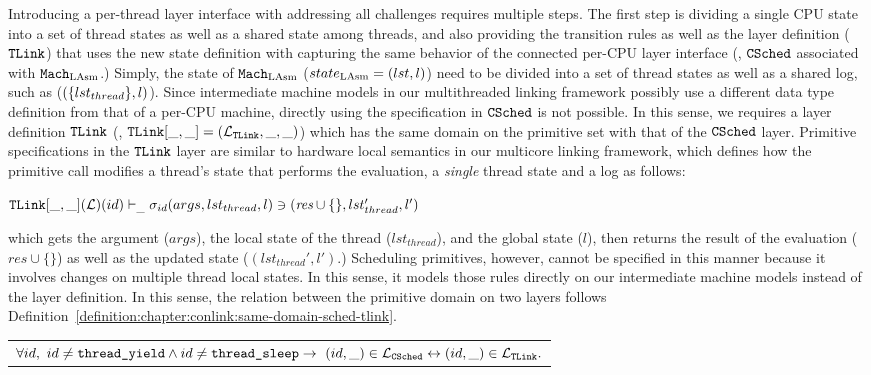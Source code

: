 Introducing a per-thread layer interface with addressing all challenges requires multiple steps. 
The first step is
dividing a single CPU state into a set of thread states as well as a shared state among threads,
and also providing 
the transition rules as well as the layer definition (${{\mathrm{\texttt{TLink}}}}$) that uses the new state definition with capturing 
the same behavior of the connected per-CPU layer interface (\ie, ${{\mathrm{\texttt{CSched}}}}$ associated with ${\mathrm{\texttt{Mach}}}_{\mathrm{LAsm}}$.)
Simply, the state of ${\mathrm{\texttt{Mach}}}_{\mathrm{LAsm}}$ ($state_{\mathrm{LAsm}} = (lst, l)$) need to be divided into 
a set of thread states as well as a shared log, such as ($(\{lst_{thread}\}, l)$).
Since intermediate machine models in our multithreaded linking framework possibly use a different data type definition from that of a per-CPU machine, 
directly using the specification in  ${{\mathrm{\texttt{CSched}}}}$ is not possible. 
In this sense, 
we requires a layer definition ${{\mathrm{\texttt{TLink}}}}$ (\ie, ${{\mathrm{\texttt{TLink}}}}[\_, \_] = (\mathcal{L}_{{{\mathrm{\texttt{TLink}}}}}, \_, \_)$) which has the same domain on the primitive set with that of the ${{\mathrm{\texttt{CSched}}}}$ layer.
Primitive specifications in the ${{\mathrm{\texttt{TLink}}}}$ layer are similar to hardware local semantics in our multicore linking framework,
which defines how the primitive call modifies a thread's state that performs the evaluation,
a \textit{single} thread state and a log as follows:
\begin{center}
${{\mathrm{\texttt{TLink}}}}[\_, \_](\mathcal{L})(id)
 \vdash_{\_}  \sigma_{id}(args, lst_{thread}, l) \ni (\textit{res}\cup \{\}, lst_{thread}', l')$
\end{center}
which gets the argument ($args$), the local state of the thread ($lst_{thread}$), and the global state ($l$), then 
returns the result of the evaluation ($\textit{res}\cup \{\}$) as well as the updated state ($(lst_{thread}', l')$.)
Scheduling primitives, however, cannot be specified in this manner because it involves changes on multiple thread local states. 
 In this sense, it models those rules directly on our intermediate machine models 
 instead of the layer definition.
In this sense, 
the relation between the primitive domain on two layers follows
Definition~\ref{definition:chapter:conlink:same-domain-sched-tlink}.


%

\begin{definition}
\label{definition:chapter:conlink:same-domain-sched-tlink}
\begin{tabular}{P{0.95\textwidth}}
$\forall id,\ id \neq {\mathrm{\texttt{thread\_yield}}} \wedge id \neq {\mathrm{\texttt{thread\_sleep}}} \rightarrow 
 \ (id, \_) \in \mathcal{L}_{{{\mathrm{\texttt{CSched}}}}} \leftrightarrow (id, \_) \in  \mathcal{L}_{{{\mathrm{\texttt{TLink}}}}}.$\\
\end{tabular}
\end{definition}


